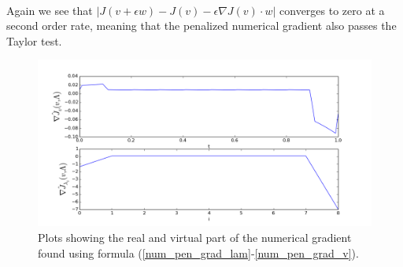 \\
Again we see that $|J(v+\epsilon w)-J(v)-\epsilon \nabla J(v)\cdot w|$ converges to zero at a second order rate, meaning that the penalized numerical gradient also passes the Taylor test.
\begin{figure}[!h]
\centering
\includegraphics[scale=0.5]{pen_num_grad.png}
\caption{Plots showing the real and virtual part of the numerical gradient found using formula (\ref{num_pen_grad_lam}-\ref{num_pen_grad_v}).}
\end{figure}
